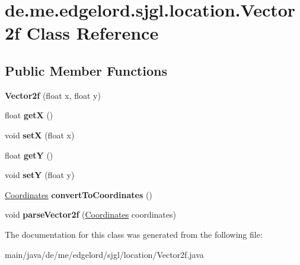 \hypertarget{classde_1_1me_1_1edgelord_1_1sjgl_1_1location_1_1_vector2f}{}\section{de.\+me.\+edgelord.\+sjgl.\+location.\+Vector2f Class Reference}
\label{classde_1_1me_1_1edgelord_1_1sjgl_1_1location_1_1_vector2f}
\subsection*{Public Member Functions}
\begin{DoxyCompactItemize}
\item 
\mbox{\label{classde_1_1me_1_1edgelord_1_1sjgl_1_1location_1_1_vector2f_a0818218da1d7d1ecfabf33271e3bb23d}} 
{\bfseries Vector2f} (float x, float y)
\item 
\mbox{\label{classde_1_1me_1_1edgelord_1_1sjgl_1_1location_1_1_vector2f_a110c4eb3749ba1bbaafa34cfb88bbfcf}} 
float {\bfseries getX} ()
\item 
\mbox{\label{classde_1_1me_1_1edgelord_1_1sjgl_1_1location_1_1_vector2f_ad10523a3ad636ffc2a1236f6c735d2ac}} 
void {\bfseries setX} (float x)
\item 
\mbox{\label{classde_1_1me_1_1edgelord_1_1sjgl_1_1location_1_1_vector2f_a6e51a9c13dcb1008f3101e0f42ff6118}} 
float {\bfseries getY} ()
\item 
\mbox{\label{classde_1_1me_1_1edgelord_1_1sjgl_1_1location_1_1_vector2f_ad6e3a4e717b5c8ea96a6feeb7a6d2393}} 
void {\bfseries setY} (float y)
\item 
\mbox{\label{classde_1_1me_1_1edgelord_1_1sjgl_1_1location_1_1_vector2f_a64b6ab8e30fb7a4c31722cf7ff654671}} 
\mbox{\hyperlink{classde_1_1me_1_1edgelord_1_1sjgl_1_1location_1_1_coordinates}{Coordinates}} {\bfseries convert\+To\+Coordinates} ()
\item 
\mbox{\label{classde_1_1me_1_1edgelord_1_1sjgl_1_1location_1_1_vector2f_a73acecbe2a79ff67ce3fb643ac3cd9a3}} 
void {\bfseries parse\+Vector2f} (\mbox{\hyperlink{classde_1_1me_1_1edgelord_1_1sjgl_1_1location_1_1_coordinates}{Coordinates}} coordinates)
\end{DoxyCompactItemize}


The documentation for this class was generated from the following file\+:\begin{DoxyCompactItemize}
\item 
main/java/de/me/edgelord/sjgl/location/Vector2f.\+java\end{DoxyCompactItemize}
